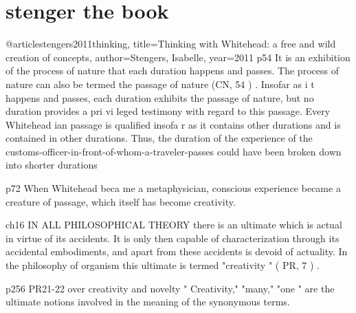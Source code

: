 \documentclass[a4paper]{Thesis}
\begin{document}
\section{stenger the book}
@article{stengers2011thinking,
	title={Thinking with Whitehead: a free and wild creation of concepts},
	author={Stengers, Isabelle},
	year={2011}
}
p54
It is an exhibition of the process of nature that each duration happens
and passes. The process of nature can also be termed the passage of nature
(CN, 54 ) .
Insofar as i t happens and passes, each duration exhibits the passage of
nature, but no duration provides a pri vi leged testimony with regard to
this passage. Every Whitehead ian passage is qualified insofa r as it contains
other durations and is contained in other durations. Thus, the duration of
the experience of the customs-officer-in-front-of-whom-a-traveler-passes
could have been broken down into shorter durations

p72
When Whitehead beca me a metaphysician,
conscious experience became a creature of passage, which itself has
become creativity.

ch16
IN ALL PHILOSOPHICAL THEORY there is an ultimate which is actual
in virtue of its accidents. It is only then capable of characterization
through its accidental embodiments, and apart from these
accidents is devoid of actuality. In the philosophy of organism this ultimate
is termed "creativity " ( PR, 7 ) .

p256 PR21-22 over creativity and novelty
" Creativity," "many," "one " are the ultimate notions involved in the
meaning of the synonymous terms.

%
\end{document}
